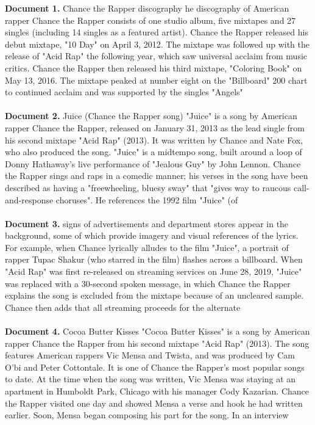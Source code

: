 \begin{figure*}[ht!]

\large
\begin{tcolorbox}[boxrule=0pt]
  \textbf{Document 1.} Chance the Rapper discography he discography of American rapper Chance the Rapper consists of one studio album, five mixtapes and 27 singles (including 14 singles as a featured artist). Chance the Rapper released his debut mixtape, "10 Day" on April 3, 2012. The mixtape was followed up with the release of "Acid Rap" the following year, which saw universal acclaim from music critics. Chance the Rapper then released his third mixtape, "Coloring Book" on May 13, 2016. The mixtape peaked at number eight on the "Billboard" 200 chart to continued acclaim and was supported by the singles "Angels"\\\\
  \textbf{Document 2.} Juice (Chance the Rapper song) "Juice" is a song by American rapper Chance the Rapper, released on January 31, 2013 as the lead single from his second mixtape "Acid Rap" (2013). It was written by Chance and Nate Fox, who also produced the song. "Juice" is a midtempo song, built around a loop of Donny Hathaway's live performance of "Jealous Guy" by John Lennon. Chance the Rapper sings and raps in a comedic manner; his verses in the song have been described as having a "freewheeling, bluesy sway" that "gives way to raucous call-and-response choruses". He references the 1992 film "Juice" (of\\\\
  \textbf{Document 3.} signs of advertisements and department stores appear in the background, some of which provide imagery and visual references of the lyrics. For example, when Chance lyrically alludes to the film "Juice", a portrait of rapper Tupac Shakur (who starred in the film) flashes across a billboard. When "Acid Rap" was first re-released on streaming services on June 28, 2019, "Juice" was replaced with a 30-second spoken message, in which Chance the Rapper explains the song is excluded from the mixtape because of an uncleared sample. Chance then adds that all streaming proceeds for the alternate\\\\
  \textbf{Document 4.} Cocoa Butter Kisses "Cocoa Butter Kisses" is a song by American rapper Chance the Rapper from his second mixtape "Acid Rap" (2013). The song features American rappers Vic Mensa and Twista, and was produced by Cam O'bi and Peter Cottontale. It is one of Chance the Rapper's most popular songs to date. At the time when the song was written, Vic Mensa was staying at an apartment in Humboldt Park, Chicago with his manager Cody Kazarian. Chance the Rapper visited one day and showed Mensa a verse and hook he had written earlier. Soon, Mensa began composing his part for the song. In an interview\\\\

\end{tcolorbox}
\end{figure*}
